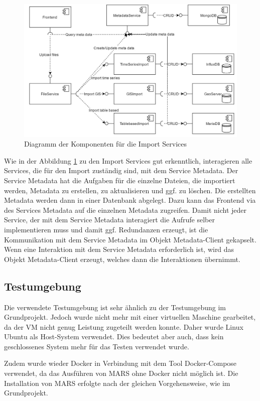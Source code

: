 \documentclass{llncs}
\begin{document}
\begin{figure}[htbp]
  \centering
      \includegraphics[width=1\textwidth]{./Images/ImportServices}
    \caption{Diagramm der Komponenten für die Import Services}
    \label{fig:ImportServices}
\end{figure}

Wie in der Abbildung \ref{fig:ImportServices} zu den Import Services gut erkenntlich, interagieren alle Services, die für den Import zuständig sind, mit dem Service Metadata. Der Service Metadata hat die Aufgaben für die einzelne Dateien, die importiert werden, Metadata zu erstellen, zu aktualisieren und ggf. zu löschen. Die erstellten Metadata werden dann in einer Datenbank abgelegt. Dazu kann das Frontend via des Services Metadata auf die einzelnen Metadata zugreifen. Damit nicht jeder Service, der mit dem Service Metadata interagiert die Aufrufe selber implementieren muss und damit ggf. Redundanzen erzeugt, ist die Kommunikation mit dem Service Metadata im Objekt Metadata-Client gekapselt. Wenn eine Interaktion mit dem Service Metadata erforderlich ist, wird das Objekt Metadata-Client erzeugt, welches dann die Interaktionen übernimmt.

\subsection{Testumgebung}
Die verwendete Testumgebung ist sehr ähnlich zu der Testumgebung im Grundprojekt. Jedoch wurde nicht mehr mit einer virtuellen Maschine gearbeitet, da der VM nicht genug Leistung zugeteilt werden konnte. Daher wurde Linux Ubuntu als Host-System verwendet. Dies bedeutet aber auch, dass kein geschlossenes System mehr für das Testen verwendet wurde. 

Zudem wurde wieder Docker in Verbindung mit dem Tool Docker-Compose verwendet, da das Ausführen von MARS ohne Docker nicht möglich ist. Die Installation von MARS erfolgte nach der gleichen Vorgehensweise, wie im Grundprojekt. 
\end{document}
